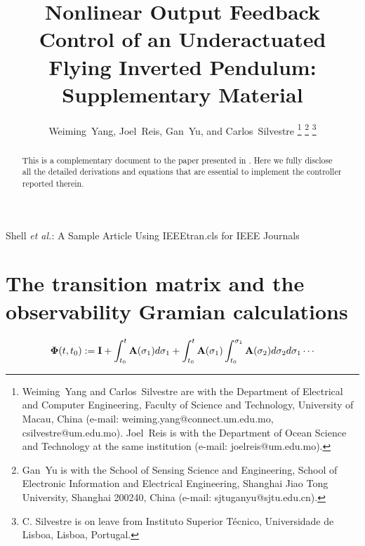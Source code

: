 \documentclass[journal,onecolumn]{IEEEtran}
\begin{document}
\title{Nonlinear Output Feedback Control of an Underactuated  Flying Inverted Pendulum: Supplementary Material}

\author{Weiming~Yang,
		Joel~Reis,
        Gan~Yu, and 
        Carlos~Silvestre
	\thanks{Weiming~Yang and Carlos~Silvestre are with the Department of Electrical and Computer Engineering, Faculty of Science and Technology, University of Macau, China (e-mail: weiming.yang@connect.um.edu.mo, csilvestre@um.edu.mo).
		Joel~Reis is with the Department of Ocean Science and Technology at the same institution (e-mail: joelreis@um.edu.mo).}
	\thanks{Gan~Yu is with the School of Sensing Science and Engineering, School of Electronic Information and Electrical Engineering, Shanghai Jiao Tong University, Shanghai 200240, China (e-mail: sjtuganyu@sjtu.edu.cn).}
	\thanks{C. Silvestre is on leave from Instituto Superior Técnico, Universidade de Lisboa, Lisboa, Portugal.}
}

%
{Shell \MakeLowercase{\textit{et al.}}: A Sample Article Using IEEEtran.cls for IEEE Journals}

\maketitle

\begin{abstract}
	This is a complementary document to the paper presented in \cite{2024_Yang_TIE}.
	Here we fully disclose all the detailed derivations and equations that are essential to implement the controller reported therein.
\end{abstract}

\section{The transition matrix and the observability Gramian calculations}

	\begin{align}
	\boldsymbol{\Phi}(t,t_0):= {\mathbf I} + \int_{t_0}^t{\mathbf A}(\sigma_1)d\sigma_1 + \int_{t_0}^t{\mathbf A}(\sigma_1)\int_{t_0}^{\sigma_1}{\mathbf A}(\sigma_2)d\sigma_2d\sigma_1 \cdots
	\label{def:Phi_t_t0}
\end{align}
\end{document}
